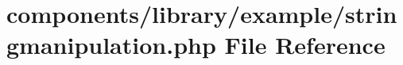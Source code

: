 \hypertarget{stringmanipulation_8php}{
\section{components/library/example/stringmanipulation.php File Reference}
\label{stringmanipulation_8php}
}
